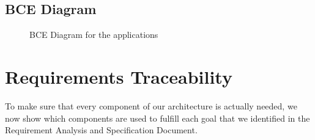 \documentclass[english]{article}
\begin{document}
\subsection{BCE Diagram}

\begin{figure}[H]
	\centering
	\caption{BCE Diagram for the applications}
\end{figure}

\newpage

\section{Requirements Traceability}
To make sure that every component of our architecture is actually needed, we now show which components are used to fulfill each goal that we identified in the Requirement Analysis and Specification Document.
\end{document}
